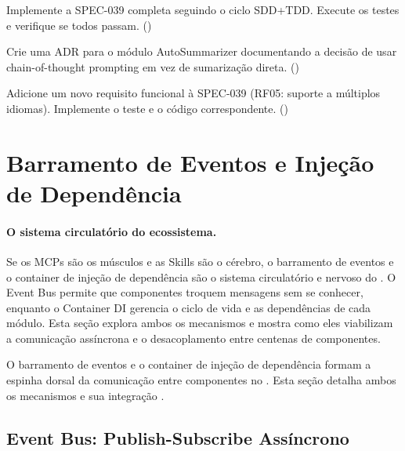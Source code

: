 \begin{exercicio}
Implemente a SPEC-039 completa seguindo o ciclo SDD+TDD. Execute os
testes e verifique se todos passam. (\nivelintermediario)
\end{exercicio}

\begin{exercicio}
Crie uma ADR para o módulo AutoSummarizer documentando a decisão de
usar chain-of-thought prompting em vez de sumarização direta.
(\nivelavancado)
\end{exercicio}

\begin{exercicio}
Adicione um novo requisito funcional à SPEC-039 (RF05: suporte a
múltiplos idiomas). Implemente o teste e o código correspondente.
(\nivelavancado)
\end{exercicio}

\section{Barramento de Eventos e Injeção de Dependência}
\label{sec:event-bus}
\nivelavancado

\paragraph{O sistema circulatório do ecossistema.} Se os MCPs são os músculos e as Skills são o cérebro, o barramento de eventos e o container de injeção de dependência são o sistema circulatório e nervoso do \opencodeeco{}. O Event Bus permite que componentes troquem mensagens sem se conhecer, enquanto o Container DI gerencia o ciclo de vida e as dependências de cada módulo. Esta seção explora ambos os mecanismos e mostra como eles viabilizam a comunicação assíncrona e o desacoplamento entre centenas de componentes.

O barramento de eventos e o container de injeção de dependência formam
a espinha dorsal da comunicação entre componentes no \opencodeeco{}.
Esta seção detalha ambos os mecanismos e sua integração
\cite{fowler2019refactoring, sommerville2011engenharia}.

\subsection{Event Bus: Publish-Subscribe Assíncrono}
\label{subsec:event-bus}

